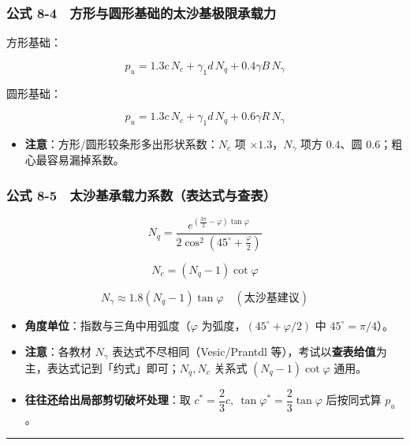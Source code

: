 \documentclass[
]{article}
\providecommand{\tightlist}{%
  \setlength{\itemsep}{0pt}\setlength{\parskip}{0pt}}
\begin{document}
\subsubsection{公式
8-4　方形与圆形基础的太沙基极限承载力}\label{ux516cux5f0f-8-4-ux65b9ux5f62ux4e0eux5706ux5f62ux57faux7840ux7684ux592aux6c99ux57faux6781ux9650ux627fux8f7dux529b}

方形基础：

\[p_u=1.3c\,N_c+\gamma_1 d\,N_q+0.4\gamma B\,N_\gamma\]

圆形基础：

\[p_u=1.3c\,N_c+\gamma_1 d\,N_q+0.6\gamma R\,N_\gamma\]

\begin{itemize}
\tightlist
\item
  \textbf{注意}：方形/圆形较条形多出形状系数：\(N_c\) 项
  \(\times1.3\)，\(N_\gamma\) 项方 \(0.4\)、圆
  \(0.6\)；粗心最容易漏掉系数。
\end{itemize}

\subsubsection{公式
8-5　太沙基承载力系数（表达式与查表）}\label{ux516cux5f0f-8-5-ux592aux6c99ux57faux627fux8f7dux529bux7cfbux6570ux8868ux8fbeux5f0fux4e0eux67e5ux8868}

\[N_q=\frac{e^{\left(\frac{3\pi}{2}-\varphi\right)\tan\varphi}}{2\cos^2\left(45^{\circ}+\frac{\varphi}{2}\right)}\]

\[N_c=\left(N_q-1\right)\cot\varphi\]

\[N_\gamma\approx1.8\left(N_q-1\right)\tan\varphi\quad(\text{太沙基建议})\]

\begin{itemize}
\tightlist
\item
  \textbf{角度单位}：指数与三角中用弧度（\(\varphi\)
  为弧度，\(\left(45^{\circ}+\varphi/2\right)\) 中
  \(45^{\circ}=\pi/4\)）。
\item
  \textbf{注意}：各教材 \(N_\gamma\) 表达式不尽相同（Vesic/Prantdl
  等），考试以\textbf{查表给值}为主，表达式记到「约式」即可；\(N_q,N_c\)
  关系式 \(\left(N_q-1\right)\cot\varphi\) 通用。
\item
  \textbf{往往还给出局部剪切破坏处理}：取
  \(c^*=\dfrac{2}{3}c,\ \tan\varphi^*=\dfrac{2}{3}\tan\varphi\)
  后按同式算 \(p_u\)。
\end{itemize}

\begin{center}\rule{0.5\linewidth}{0.5pt}\end{center}
\end{document}
